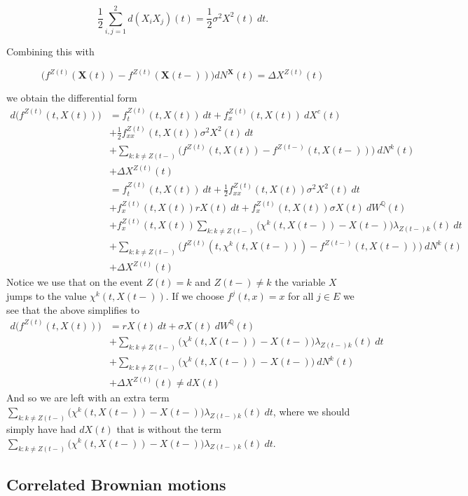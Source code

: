 \documentclass[a4paper,12pt,openany]{book}
\begin{document}
\[
\frac{1}{2}\sum_{i,j=1}^2d(X_iX_j)(t)=\frac{1}{2}\sigma^2X^2(t)\ dt.
\]

Combining this with

\[
\Big(f^{Z(t)}(\mathbf X(t))-f^{Z(t)}(\mathbf X(t-))\Big)dN^\mathbf X(t)=\Delta X^{Z(t)}(t)
\]

we obtain the differential form
\begin{align*}
d \Big(f^{Z(t)}(t,X(t))\Big)&=f_t^{Z(t)}(t,X(t))\ dt+f_x^{Z(t)}(t,X(t))\ dX^c(t)\\
&+\frac{1}{2}f^{Z(t)}_{xx}(t,X(t))\sigma^2X^2(t)\ dt\\
&+\sum_{k:k\ne Z(t-)}\Big(f^{Z(t)}(t,X(t))-f^{Z(t-)}(t,X(t-))\Big)\ dN^k(t)\\
&+\Delta X^{Z(t)}(t)\\
&=f_t^{Z(t)}(t,X(t))\ dt+\frac{1}{2}f^{Z(t)}_{xx}(t,X(t))\sigma^2X^2(t)\ dt\\
&+f_x^{Z(t)}(t,X(t))rX(t)\ dt+f_x^{Z(t)}(t,X(t))\sigma X(t)\ dW^\mathbb Q(t)\\
&+f_x^{Z(t)}(t,X(t))\sum_{k:k\ne Z(t-)}\Big(\chi^k(t,X(t-))-X(t-)\Big)\lambda_{Z(t-)k}(t)\ dt\\
&+\sum_{k:k\ne Z(t-)}\Big(f^{Z(t)}(t,\chi^k(t,X(t-)))-f^{Z(t-)}(t,X(t-))\Big)\ dN^k(t)\\
&+\Delta X^{Z(t)}(t)
\end{align*}
Notice we use that on the event \(Z(t)=k\) and \(Z(t-)\ne k\) the variable \(X\) jumps to the value \(\chi^k(t,X(t-))\). If we choose \(f^j(t,x)=x\) for all \(j\in E\) we see that the above simplifies to
\begin{align*}
d \Big(f^{Z(t)}(t,X(t))\Big)&=rX(t)\ dt+\sigma X(t)\ dW^\mathbb Q(t)\\
&+\sum_{k:k\ne Z(t-)}\Big(\chi^k(t,X(t-))-X(t-)\Big)\lambda_{Z(t-)k}(t)\ dt\\
&+\sum_{k:k\ne Z(t-)}\Big(\chi^k(t,X(t-))-X(t-))\ dN^k(t)\\
&+\Delta X^{Z(t)}(t)\ne dX(t)
\end{align*}
And so we are left with an extra term \(\sum_{k:k\ne Z(t-)}\Big(\chi^k(t,X(t-))-X(t-)\Big)\lambda_{Z(t-)k}(t)\ dt\), where we should simply have had \(dX(t)\) that is without the term \(\sum_{k:k\ne Z(t-)}\Big(\chi^k(t,X(t-))-X(t-)\Big)\lambda_{Z(t-)k}(t)\ dt\).

\hypertarget{correlated-brownian-motions}{%
\subsection{Correlated Brownian motions}\label{correlated-brownian-motions}}
\end{document}
